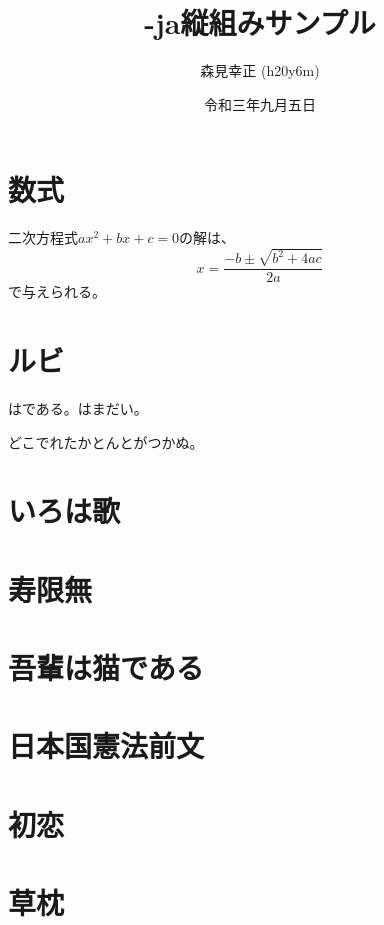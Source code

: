 \documentclass[a4paper,twocolumn]{article}
\title{\XeLaTeX-ja縦組みサンプル}
\author{森見幸正 (h20y6m)}
\date{令和三年九月五日}
\begin{document}
\maketitle

\section{数式}

二次方程式$ax^2+bx+c=0$の解は、
\[ x = \frac{-b\pm\sqrt{b^2+4ac}}{2a} \]
で与えられる。

\section{ルビ}

はである。はまだい。

どこでれたかとんとがつかぬ。

\section{いろは歌}

\section{寿限無}

\section{吾輩は猫である}

\section{日本国憲法前文}

\section{初恋}

\section{草枕}
\end{document}
